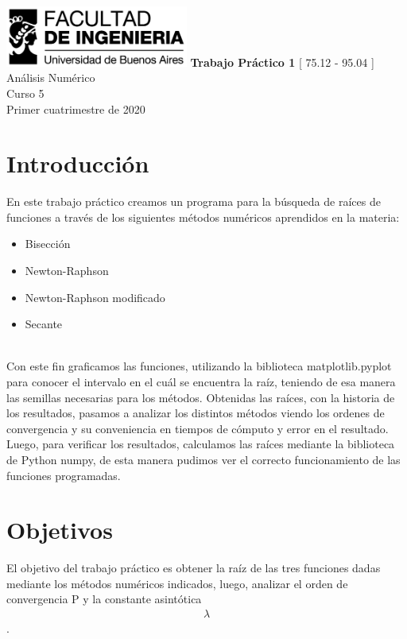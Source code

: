 \documentclass[titlepage,a4paper]{article}
\begin{document}
\begin{titlepage} %
	\hfill\includegraphics[width=6cm]{logofiuba.jpg}
    \centering
    \vfill
    \Huge \textbf{Trabajo Práctico 1}
    \vskip2cm
    \Large [ 75.12 - 95.04 ] Análisis Numérico\\
    Curso 5 \\ 
    Primer cuatrimestre de 2020 
    \vfill
    \vfill
    \vfill
\end{titlepage}

\tableofcontents %

\section{Introducción}\label{sec:intro}
En este trabajo práctico creamos un programa para la búsqueda de raíces de funciones a través de los siguientes métodos numéricos aprendidos en la materia:
\begin{itemize}
\item Bisección
\item Newton-Raphson
\item Newton-Raphson modificado
\item Secante
\end{itemize}
\\Con este fin graficamos las funciones, utilizando la biblioteca matplotlib.pyplot para conocer el intervalo en el cuál se encuentra la raíz, teniendo de esa manera las semillas necesarias para los métodos. Obtenidas las raíces, con la historia de los resultados, pasamos a analizar los distintos métodos viendo los ordenes de convergencia y su conveniencia en tiempos de cómputo y error en el resultado.
Luego, para verificar los resultados, calculamos las raíces mediante la biblioteca de Python numpy, de esta manera pudimos ver el correcto funcionamiento de las funciones programadas.

\section{Objetivos}\label{sec:objetivos}
El objetivo del trabajo práctico es obtener la raíz de las tres funciones dadas mediante los métodos numéricos indicados, luego, analizar el orden de convergencia P y la constante asintótica \begin{align}
\lambda
\end{align}. 
\end{document}
